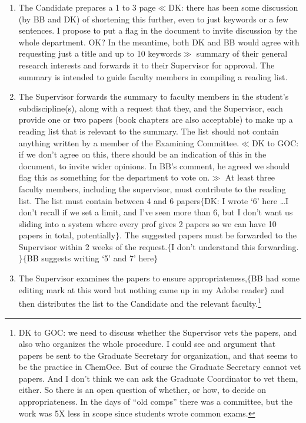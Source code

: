 \documentclass[12pt]{article}
\newcommand{\fixme}[1]{\color{fixmeColor}$\{$#1$\}$\color{black}\index{$>>>>$FIXME$<<<<$}}
\newcommand{\vote}[1]{\color{voteColor}$\ll$#1$\gg$\color{black}\marginpar[$\gg$ vote]{$\ll$ vote}\index{$>>>>$VOTE$<<<<$}}
\newcommand{\discuss}[1]{\footnote{\color{fixmeColor}#1\color{black}}\index{$>>>>$DISCUSS$<<<<$}}
\newcommand{\supervisor}{Supervisor\xspace}
\newcommand{\GC}{Graduate Coordinator\xspace}
\newcommand{\GS}{Graduate Secretary\xspace}
\begin{document}
\begin{enumerate}

    \item The Candidate prepares a 1 to 3 page\vote{DK: there has been some
        discussion (by BB and DK) of shortening this further, even to just
        keywords or a few sentences. I propose to put a flag in the document
        to invite discussion by the whole department. OK? In the meantime, both
        DK and BB would agree with requesting just a title and up to 10
        keywords} summary of their general research interests and forwards it
        to their Supervisor for approval.  The summary is intended to guide
        faculty members in compiling a reading list.

    \item The Supervisor forwards the summary to faculty members in the
        student's subdiscipline(s), along with a request that they, and the
        Supervisor, each provide one or two papers (book chapters are also
        acceptable) to make up a reading list that is relevant to the summary.
        The list should not contain anything written by a member of the Examining
        Committee.\vote{DK to GOC: if we don't agree on this, there should be an
        indication of this in the document, to invite wider opinions. In
        BB's comment, he agreed we should flag this as something for the department to vote on.}
        At least three faculty members, including the supervisor, must
        contribute to the reading list. The list must contain between 4 and 6
        papers\fixme{DK: I wrote `6' here \ldots I don't recall if we
        set a limit, and I've seen more than 6, but I don't want us sliding
        into a system where every prof gives 2 papers so we can have 10 papers
        in total, potentially}. The suggested papers must be forwarded to the
        Supervisor within 2 weeks of the request.\fixme{I don't understand
        this forwarding.}\fixme{BB suggests writing `5' and 7' here}

    \item The \supervisor examines the papers to ensure appropriateness,\fixme{BB had some editing mark at this word but nothing came up in my Adobe reader} and then
        distributes the list to the Candidate and the relevant
        faculty.\discuss{DK to GOC: we need to discuss whether the \supervisor vets
        the papers, and also who organizes the whole procedure. I could see
        and argument that papers be sent to the \GS for organization, and that
        seems to be the practice in ChemOce. But of course the \GS cannot vet
        papers. And I don't think we can ask the \GC to vet them, either. So
        there is an open question of whether, or how, to decide on
        appropriateness. In the days of ``old comps'' there was a committee, but
        the work was 5X less in scope since students wrote common exams.}
            

\end{enumerate}
\end{document}
